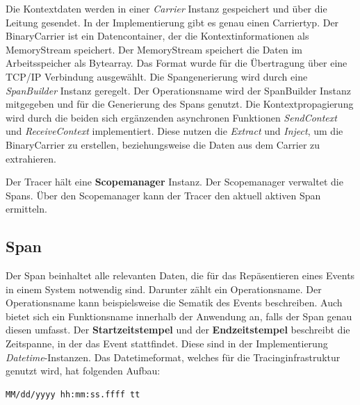 Die Kontextdaten werden in einer \emph{Carrier} Instanz gespeichert und über die Leitung gesendet. In der Implementierung gibt es genau einen Carriertyp. Der BinaryCarrier ist ein Datencontainer, der die Kontextinformationen als MemoryStream speichert. Der MemoryStream speichert die Daten im Arbeitsspeicher als Bytearray. Das Format wurde für die Übertragung über eine TCP/IP Verbindung ausgewählt. 
Die Spangenerierung wird durch eine \emph{SpanBuilder} Instanz geregelt. Der Operationsname wird der SpanBuilder Instanz mitgegeben und für die Generierung des Spans genutzt. Die Kontextpropagierung wird durch die beiden sich ergänzenden asynchronen Funktionen \emph{SendContext} und \emph{ReceiveContext} implementiert. Diese nutzen die \emph{Extract} und \emph{Inject}, um die BinaryCarrier zu erstellen, beziehungsweise die Daten aus dem Carrier zu extrahieren.

Der Tracer hält eine \textbf{Scopemanager} Instanz. Der Scopemanager verwaltet die Spans. Über den Scopemanager kann der Tracer den aktuell aktiven Span ermitteln.


\subsection{Span}
\label{subsection:Span}
Der Span beinhaltet alle relevanten Daten, die für das Repäsentieren eines Events in einem System notwendig sind. Darunter zählt ein Operationsname. Der Operationsname kann beispielsweise die Sematik des Events beschreiben. Auch bietet sich ein Funktionsname innerhalb der Anwendung an, falls der Span genau diesen umfasst. Der \textbf{Startzeitstempel} und der \textbf{Endzeitstempel} beschreibt die Zeitspanne, in der das Event stattfindet. Diese sind in der Implementierung \emph{Datetime}-Instanzen. Das Datetimeformat, welches für die Tracinginfrastruktur genutzt wird, hat folgenden Aufbau:

\begin{minipage}[]{\textwidth}
	\begin{lstlisting}[frame=trBL]
	MM/dd/yyyy hh:mm:ss.ffff tt
	\end{lstlisting}
	\label{listing:Tracer Verbindungsaufbau}
\end{minipage} 

